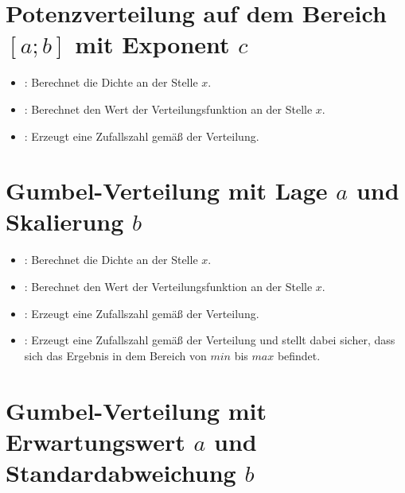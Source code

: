 \section{Potenzverteilung auf dem Bereich \texorpdfstring{$[a;b]$}{[a;b]} mit Exponent \texorpdfstring{$c$}{c}}

\begin{itemize}

\item
{}:
Berechnet die Dichte an der Stelle $x$.

\item
{}:
Berechnet den Wert der Verteilungsfunktion an der Stelle $x$.

\item
{}:
Erzeugt eine Zufallszahl gemäß der Verteilung.

\end{itemize}



\section{Gumbel-Verteilung mit Lage \texorpdfstring{$a$}{a} und Skalierung \texorpdfstring{$b$}{b}}

\begin{itemize}

\item
{}:
Berechnet die Dichte an der Stelle $x$.

\item
{}:
Berechnet den Wert der Verteilungsfunktion an der Stelle $x$.

\item
{}:
Erzeugt eine Zufallszahl gemäß der Verteilung.

\item
{}:
Erzeugt eine Zufallszahl gemäß der Verteilung und stellt dabei sicher, dass sich das Ergebnis in dem Bereich von $min$ bis $max$ befindet.

\end{itemize}



\section{Gumbel-Verteilung mit Erwartungswert \texorpdfstring{$a$}{a} und Standardabweichung \texorpdfstring{$b$}{b}}

